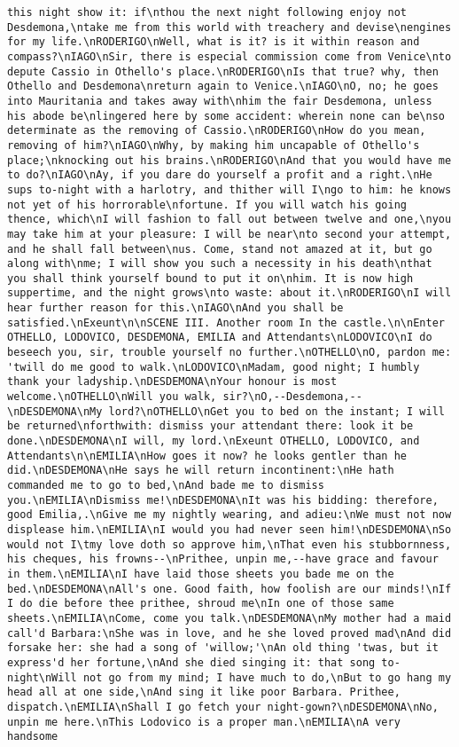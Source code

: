 \begin{verbatim}
this night show it: if\nthou the next night following enjoy not Desdemona,\ntake me from this world with treachery and devise\nengines for my life.\nRODERIGO\nWell, what is it? is it within reason and compass?\nIAGO\nSir, there is especial commission come from Venice\nto depute Cassio in Othello's place.\nRODERIGO\nIs that true? why, then Othello and Desdemona\nreturn again to Venice.\nIAGO\nO, no; he goes into Mauritania and takes away with\nhim the fair Desdemona, unless his abode be\nlingered here by some accident: wherein none can be\nso determinate as the removing of Cassio.\nRODERIGO\nHow do you mean, removing of him?\nIAGO\nWhy, by making him uncapable of Othello's place;\nknocking out his brains.\nRODERIGO\nAnd that you would have me to do?\nIAGO\nAy, if you dare do yourself a profit and a right.\nHe sups to-night with a harlotry, and thither will I\ngo to him: he knows not yet of his horrorable\nfortune. If you will watch his going thence, which\nI will fashion to fall out between twelve and one,\nyou may take him at your pleasure: I will be near\nto second your attempt, and he shall fall between\nus. Come, stand not amazed at it, but go along with\nme; I will show you such a necessity in his death\nthat you shall think yourself bound to put it on\nhim. It is now high suppertime, and the night grows\nto waste: about it.\nRODERIGO\nI will hear further reason for this.\nIAGO\nAnd you shall be satisfied.\nExeunt\n\nSCENE III. Another room In the castle.\n\nEnter OTHELLO, LODOVICO, DESDEMONA, EMILIA and Attendants\nLODOVICO\nI do beseech you, sir, trouble yourself no further.\nOTHELLO\nO, pardon me: 'twill do me good to walk.\nLODOVICO\nMadam, good night; I humbly thank your ladyship.\nDESDEMONA\nYour honour is most welcome.\nOTHELLO\nWill you walk, sir?\nO,--Desdemona,--\nDESDEMONA\nMy lord?\nOTHELLO\nGet you to bed on the instant; I will be returned\nforthwith: dismiss your attendant there: look it be done.\nDESDEMONA\nI will, my lord.\nExeunt OTHELLO, LODOVICO, and Attendants\n\nEMILIA\nHow goes it now? he looks gentler than he did.\nDESDEMONA\nHe says he will return incontinent:\nHe hath commanded me to go to bed,\nAnd bade me to dismiss you.\nEMILIA\nDismiss me!\nDESDEMONA\nIt was his bidding: therefore, good Emilia,.\nGive me my nightly wearing, and adieu:\nWe must not now displease him.\nEMILIA\nI would you had never seen him!\nDESDEMONA\nSo would not I\tmy love doth so approve him,\nThat even his stubbornness, his cheques, his frowns--\nPrithee, unpin me,--have grace and favour in them.\nEMILIA\nI have laid those sheets you bade me on the bed.\nDESDEMONA\nAll's one. Good faith, how foolish are our minds!\nIf I do die before thee prithee, shroud me\nIn one of those same sheets.\nEMILIA\nCome, come you talk.\nDESDEMONA\nMy mother had a maid call'd Barbara:\nShe was in love, and he she loved proved mad\nAnd did forsake her: she had a song of 'willow;'\nAn old thing 'twas, but it express'd her fortune,\nAnd she died singing it: that song to-night\nWill not go from my mind; I have much to do,\nBut to go hang my head all at one side,\nAnd sing it like poor Barbara. Prithee, dispatch.\nEMILIA\nShall I go fetch your night-gown?\nDESDEMONA\nNo, unpin me here.\nThis Lodovico is a proper man.\nEMILIA\nA very handsome 
\end{verbatim}
